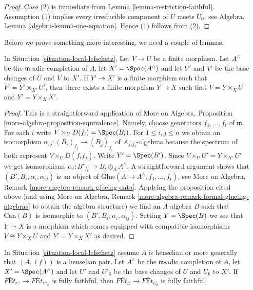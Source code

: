 \begin{proof}
Case (2) is immediate from Lemma \ref{lemma-restriction-faithful}.
Assumption (1) implies every irreducible component of $U$ meets $U_0$, see
Algebra, Lemma \ref{algebra-lemma-one-equation}.
Hence (1) follows from (2).
\end{proof}

\noindent
Before we prove something more interesting, we need a couple of lemmas.

\begin{lemma}
\label{lemma-fill-in-missing}
In Situation \ref{situation-local-lefschetz}. Let $V \to U$ be a finite
morphism.  Let $A^\wedge$ be the $\mathfrak m$-adic completion of $A$,
let $X' = \Spec(A^\wedge)$ and let $U'$ and $V'$ be the base changes of
$U$ and $V$ to $X'$. If $Y' \to X'$ is a finite morphism such that
$V' = Y' \times_{X'} U'$, then there exists a finite morphism $Y \to X$
such that $V = Y \times_X U$ and $Y' = Y \times_X X'$.
\end{lemma}

\begin{proof}
This is a straightforward application of
More on Algebra, Proposition \ref{more-algebra-proposition-equivalence}.
Namely, choose generators $f_1, \ldots, f_t$ of $\mathfrak m$.
For each $i$ write $V \times_U D(f_i) = \Spec(B_i)$.
For $1 \leq i, j \leq n$ we obtain an isomorphism
$\alpha_{ij} : (B_i)_{f_j} \to (B_j)_{f_i}$ of $A_{f_if_j}$-algebras
because the spectrum of both represent $V \times_U D(f_if_j)$.
Write $Y' = \Spec(B')$. Since $V \times_U U' = Y \times_{X'} U'$
we get isomorphisms $\alpha_i : B'_{f_i} \to B_i \otimes_A A^\wedge$.
A straightforward argument shows that $(B', B_i, \alpha_i, \alpha_{ij})$
is an object of $\text{Glue}(A \to A^\wedge, f_1, \ldots, f_t)$, see
More on Algebra, Remark \ref{more-algebra-remark-glueing-data}.
Applying the proposition cited above (and using
More on Algebra, Remark \ref{more-algebra-remark-formal-glueing-algebras}
to obtain the algebra structure) we find an $A$-algebra $B$ such that
$\text{Can}(B)$ is isomorphic to $(B', B_i, \alpha_i, \alpha_{ij})$.
Setting $Y = \Spec(B)$ we see that $Y \to X$ is a morphism
which comes equipped with compatible isomorphisms
$V \cong Y \times_X U$ and $Y' = Y \times_X X'$ as desired.
\end{proof}

\begin{lemma}
\label{lemma-fully-faithful-henselian-completion}
In Situation \ref{situation-local-lefschetz} assume $A$ is henselian
or more generally that $(A, (f))$ is a henselian pair.
Let $A^\wedge$ be the $\mathfrak m$-adic completion of $A$,
let $X' = \Spec(A^\wedge)$ and let $U'$ and $U'_0$ be the base changes of
$U$ and $U_0$ to $X'$. If $\textit{F\'Et}_{U'} \to \textit{F\'Et}_{U'_0}$
is fully faithful, then $\textit{F\'Et}_U \to \textit{F\'Et}_{U_0}$
is fully faithful.
\end{lemma}


